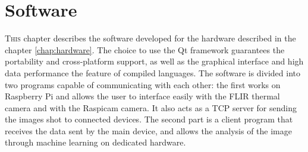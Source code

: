 \chapter{Software}
\label{chap:software}
%
\lettrine[lines=3]{T}{his} chapter describes the software developed for the
hardware described in the chapter \ref{chap:hardware}. The choice to use the Qt
framework guarantees the portability and cross-platform support, as well
as the graphical interface and high data performance the feature of compiled
languages.  The software is divided into two programs capable of communicating
with each other: the first works on Raspberry Pi and allows the user to
interface easily with the FLIR thermal camera and with the Raspicam camera. It
also acts as a TCP server for sending the images shot to connected devices. The
second part is a client program that receives the data sent by the main device,
and allows the analysis of the image through machine learning on dedicated
hardware.
%


